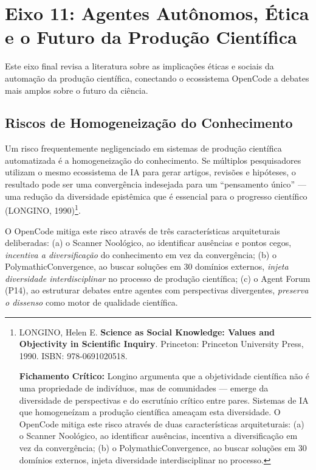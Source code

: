 \section{Eixo 11: Agentes Autônomos, Ética e o Futuro da Produção Científica}

Este eixo final revisa a literatura sobre as implicações éticas e sociais da automação da produção científica, conectando o ecossistema OpenCode a debates mais amplos sobre o futuro da ciência.

\subsection{Riscos de Homogeneização do Conhecimento}

Um risco frequentemente negligenciado em sistemas de produção científica automatizada é a homogeneização do conhecimento. Se múltiplos pesquisadores utilizam o mesmo ecossistema de IA para gerar artigos, revisões e hipóteses, o resultado pode ser uma convergência indesejada para um ``pensamento único'' --- uma redução da diversidade epistêmica que é essencial para o progresso científico (LONGINO, 1990)\footnote{
  LONGINO, Helen E. \textbf{Science as Social Knowledge: Values and Objectivity in Scientific Inquiry}. Princeton: Princeton University Press, 1990. ISBN: 978-0691020518.

  \textbf{Fichamento Crítico:} Longino argumenta que a objetividade científica não é uma propriedade de indivíduos, mas de comunidades --- emerge da diversidade de perspectivas e do escrutínio crítico entre pares. Sistemas de IA que homogeneízam a produção científica ameaçam esta diversidade. O OpenCode mitiga este risco através de duas características arquiteturais: (a) o Scanner Noológico, ao identificar ausências, incentiva a diversificação em vez da convergência; (b) o PolymathicConvergence, ao buscar soluções em 30 domínios externos, injeta diversidade interdisciplinar no processo.
}.

O OpenCode mitiga este risco através de três características arquiteturais deliberadas: (a) o Scanner Noológico, ao identificar ausências e pontos cegos, \textit{incentiva a diversificação} do conhecimento em vez da convergência; (b) o PolymathicConvergence, ao buscar soluções em 30 domínios externos, \textit{injeta diversidade interdisciplinar} no processo de produção científica; (c) o Agent Forum (P14), ao estruturar debates entre agentes com perspectivas divergentes, \textit{preserva o dissenso} como motor de qualidade científica.

